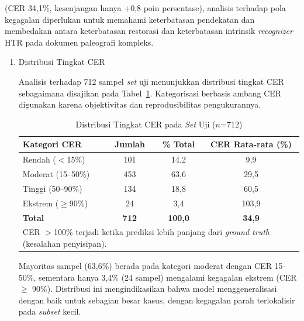 \documentclass[12pt,a4paper]{article}
\begin{document}
(CER 34,1\%, kesenjangan hanya +0,8 poin persentase), analisis terhadap pola kegagalan diperlukan untuk memahami keterbatasan pendekatan dan membedakan antara keterbatasan restorasi dan keterbatasan intrinsik \textit{recognizer} HTR pada dokumen paleografi kompleks.
\begin{enumerate}[leftmargin=1.5em, labelsep=0.5em, itemindent=0pt, label=\arabic*., topsep=0pt, partopsep=0pt]
\item Distribusi Tingkat CER

Analisis terhadap 712 sampel \textit{set} uji menunjukkan distribusi tingkat CER sebagaimana disajikan pada Tabel~\ref{table:cer-distribution}. Kategorisasi berbasis ambang CER digunakan karena objektivitas dan reprodusibilitas pengukurannya.

\begin{table}[!htbp]
    \renewcommand{\arraystretch}{1.15}
    \caption[Distribusi Tingkat CER]{Distribusi Tingkat CER pada \textit{Set} Uji ($n$=712)}
    \label{table:cer-distribution}
    \small
    \begin{tabular}{|l|c|c|c|}
        \hline
        \textbf{Kategori CER}            & \textbf{Jumlah} & \textbf{\% Total} & \textbf{CER Rata-rata (\%)}  \\
        \hline
        Rendah ($<$15\%)        & 101    & 14,2     & 9,9                 \\
        Moderat (15--50\%)      & 453    & 63,6     & 29,5                \\
        Tinggi (50--90\%)       & 134    & 18,8     & 60,5                \\
        Ekstrem ($\geq$90\%)    & 24     & 3,4      & 103,9               \\
        \hline
        \textbf{Total}          & \textbf{712} & \textbf{100,0} & \textbf{34,9} \\
        \hline
        \multicolumn{4}{l}{\footnotesize CER $>$100\% terjadi ketika prediksi lebih panjang dari \textit{ground truth} (kesalahan penyisipan).} \\
    \end{tabular}
\end{table}

Mayoritas sampel (63,6\%) berada pada kategori moderat dengan CER 15--50\%, sementara hanya 3,4\% (24 sampel) mengalami kegagalan ekstrem (CER $\geq$ 90\%). Distribusi ini mengindikasikan bahwa model menggeneralisasi dengan baik untuk sebagian besar kasus, dengan kegagalan parah terlokalisir pada \textit{subset} kecil.


\end{enumerate}
\end{document}
